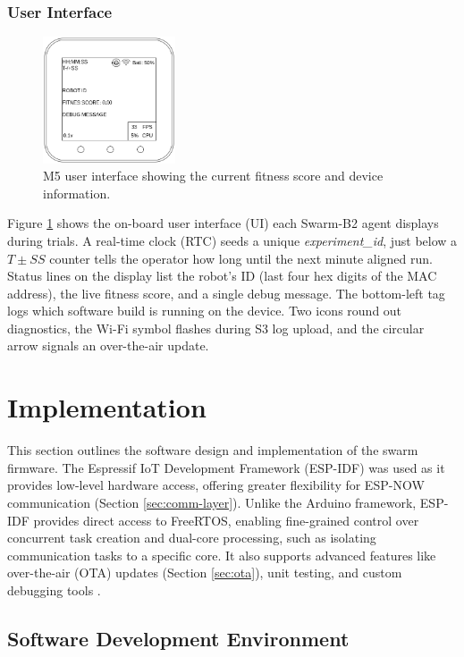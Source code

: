 \documentclass[conference]{IEEEtran}
\begin{document}
\subsubsection{User Interface}

\begin{figure}[h]
    \centering
    \includegraphics[width=0.35\textwidth]{UI.png}
    \caption{M5 user interface showing the current fitness score and device information.}
    \label{fig:UI}
\end{figure}

Figure \ref{fig:UI} shows the on-board user interface (UI) each Swarm-B2 agent displays during trials. A real-time clock (RTC) seeds a unique \emph{experiment\_id}, just below a $T\pm SS$ counter tells the operator how long until the next minute aligned run. Status lines on the display list the robot's ID (last four hex digits of the MAC address), the live fitness score, and a single debug message. The bottom-left tag logs which software build is running on the device. Two icons round out diagnostics, the Wi-Fi symbol flashes during S3 log upload, and the circular arrow signals an over-the-air update.

\section{Implementation}

This section outlines the software design and implementation of the swarm firmware. The Espressif IoT Development Framework (ESP-IDF) was used as it provides low-level hardware access, offering greater flexibility for ESP-NOW communication (Section \ref{sec:comm-layer}). Unlike the Arduino framework, ESP-IDF provides direct access to FreeRTOS, enabling fine-grained control over concurrent task creation and dual-core processing, such as isolating communication tasks to a specific core. It also supports advanced features like over-the-air (OTA) updates (Section \ref{sec:ota}), unit testing, and custom debugging tools \cite{esp-boards_esp-idf_nodate}.

\subsection{Software Development Environment}\label{sec:SDK}
\end{document}
